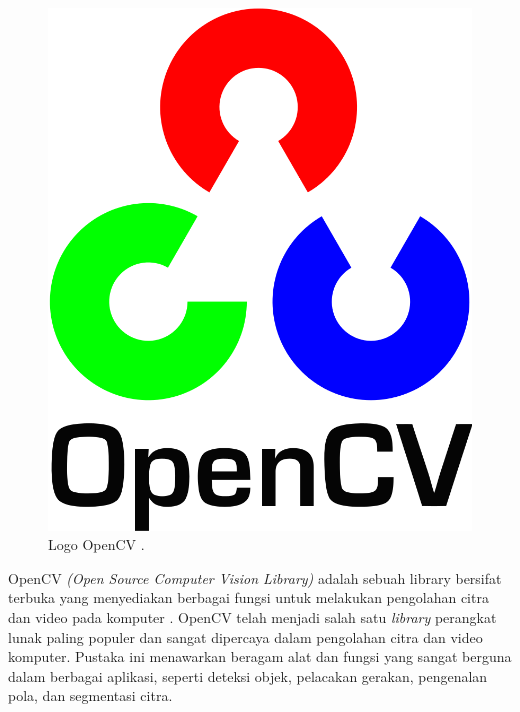 \begin{figure}[H]
  \centering

  \includegraphics[scale=0.1]{gambar/opencv.png}

  \caption{Logo OpenCV \parencite{opencv_about}.}
\end{figure}

OpenCV \textit{(Open Source Computer Vision Library)} adalah sebuah library bersifat terbuka yang menyediakan berbagai fungsi untuk  melakukan pengolahan citra dan video pada komputer \parencite{opencv_about}. OpenCV telah menjadi salah satu \textit{library} perangkat lunak paling populer dan sangat dipercaya dalam pengolahan citra dan video komputer. Pustaka ini menawarkan beragam alat dan fungsi yang sangat berguna dalam berbagai aplikasi, seperti deteksi objek, pelacakan gerakan, pengenalan pola, dan segmentasi citra.







  

